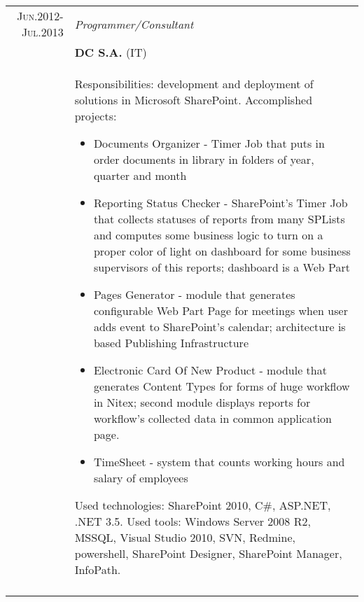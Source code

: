\documentclass[a4paper,12pt]{article}
\begin{document}
\begin{tabular}{r|p{12cm}}
	\textsc{Jun.2012-Jul.2013}
	&\emph{Programmer/Consultant} \\
	&\textsc{\textbf{DC S.A.}} (IT) \\
	&\footnotesize{
		Responsibilities: development and deployment of solutions in Microsoft SharePoint. \newline
		Accomplished projects:
		\begin{itemize}
			\item Documents Organizer - Timer Job that puts in order documents in library in folders of year, quarter and month
			\item Reporting Status Checker - SharePoint's Timer Job that collects statuses of reports from many SPLists and computes some business logic to
												turn
                                             on a proper color of light on dashboard for some business supervisors of this reports; dashboard is a Web Part
			\item Pages Generator - module that generates configurable Web Part Page for meetings when user adds event to SharePoint's calendar;
			architecture is based Publishing Infrastructure
			\item Electronic Card Of New Product - module that generates Content Types for forms of huge workflow in Nitex; second module displays reports
			for workflow's collected data in common application page.
			\item TimeSheet - system that counts working hours and salary of employees
		\end{itemize}
		Used technologies: SharePoint 2010, C\#, ASP.NET, .NET 3.5. Used tools: Windows Server 2008 R2, MSSQL, Visual Studio 2010,
		SVN, Redmine, powershell, SharePoint Designer, SharePoint Manager, InfoPath.
	}\\
	\multicolumn{2}{c}{}\\
\end{tabular}
\end{document}
